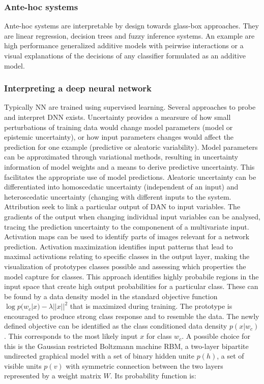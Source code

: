 		\subsubsection{Ante-hoc systems}
		Ante-hoc systems are interpretable by design towards glass-box approaches.
		They are linear regression, decision trees and fuzzy inference systems.
		An example are high performance generalized additive models with peirwise interactions or a visual explanations of the decisions of any classifier formulated as an additive model.

		\subsubsection{Interpreting a deep neural network}
		Typically NN are trained using supervised learning.
		Several approaches to probe and interpret DNN exists.
		Uncertainty provides a mearsure of how small perturbations of training data would change model parameters (model or epistemic uncertainty), or how input parameters changes would affect the prediction for one example (predictive or aleatoric variability).
		Model parameters can be approximated through variational methods, resulting in uncertainty information of model weights and a means to derive predictive uncertainty.
		This facilitates the appropriate use of model predictions.
		Aleatoric uncertainty can be differentiated into homoscedatic uncertainty (independent of an input) and heteroscedatic uncertainty (changing with different inputs to the system.
		Attribution seek to link a particular output of DAN to input variables.
		The gradients of the output when changing individual input variables can be analysed, tracing the prediction uncertainty to the componenent of a multivariate input.
		Activation maps can be used to identify parts of images relevant for a network prediction.
		Activation maximization identifies input patterns that lead to maximal activations relating to specific classes in the output layer, making the visualization of prototypes classes possible and assessing which properties the model capture for classes.
		This approach identifies highly probabile regions in the input space that create high output probabilities for a particular class.
		These can be found by a data density model in the standard objective function $\log p(w_c |x) -\lambda||x||^2$ that is maximized during training.
		The prototype is encouraged to produce strong class response and to resemble the data.
		The newly defined objective can be identified as the class conditioned data density $p(x|w_c)$.
		This corresponds to the most likely input $x$ for class $w_c$.
		A possible choice for this is the Gaussian restricted Boltzmann machine RBM, a two-layer bipartite undirected graphical model with a set of binary hidden unite $p(h)$, a set of visible units $p(v)$ with symmetric connection between the two layers represented by a weight matrix $W$.
		Its probability function is:

